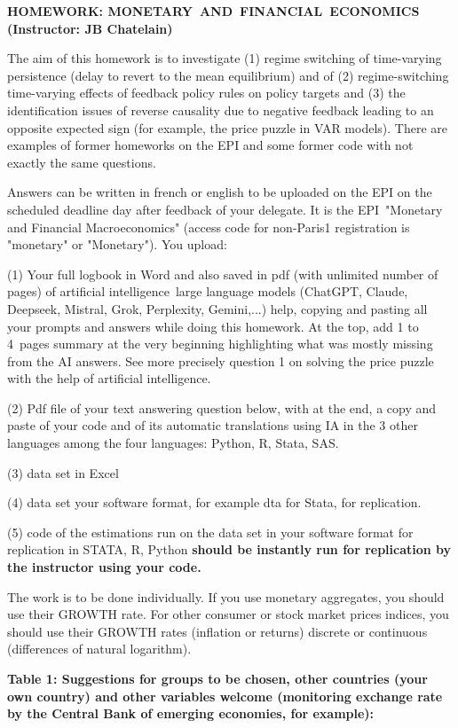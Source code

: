 \documentclass[12pt,a4paper]{article}%
\begin{document}
\textbf{HOMEWORK: MONETARY\ AND\ FINANCIAL\ ECONOMICS (Instructor: JB
Chatelain)}

The aim of this homework is to investigate (1) regime switching of
time-varying persistence (delay to revert to the mean equilibrium) and of (2)
regime-switching time-varying effects of feedback policy rules on policy
targets and (3) the identification issues of reverse causality due to negative
feedback leading to an opposite expected sign (for example, the price puzzle
in VAR models). There are examples of former homeworks on the EPI and some
former code with not exactly the same questions.

Answers can be written in french or english to be uploaded on the EPI on the
scheduled deadline day after feedback of your delegate. It is the
EPI\ "Monetary and Financial Macroeconomics" (access code for non-Paris1
registration is "monetary" or "Monetary"). You upload:

(1) Your full logbook in Word and also saved in pdf (with unlimited number of
pages) of artificial intelligence\ large language models (ChatGPT, Claude,
Deepseek, Mistral, Grok, Perplexity, Gemini,...) help, copying and pasting all
your prompts and answers while doing this homework. At the top, add 1 to
4\ pages summary at the very beginning highlighting what was mostly missing
from the AI answers. See more precisely question 1 on solving the price puzzle
with the help of artificial intelligence.

(2) Pdf file of your text answering question below, with at the end, a copy
and paste of your code and of its automatic translations using IA in the 3
other languages among the four languages: Python, R, Stata, SAS.\ 

(3) data set in Excel

(4) data set your software format, for example dta for Stata, for replication.

(5) code of the estimations run on the data set in your software format for
replication in STATA, R, Python \textbf{should be instantly run for
replication by the instructor using your code.}

The work is to be done individually. If you use monetary aggregates, you
should use their GROWTH rate. For other consumer or stock market prices
indices, you should use their GROWTH rates (inflation or returns) discrete or
continuous (differences of natural logarithm).

\textbf{Table 1: Suggestions for groups to be chosen, other countries (your
own country) and other variables welcome (monitoring exchange rate by the
Central Bank of emerging economies, for example):}%
\end{document}

